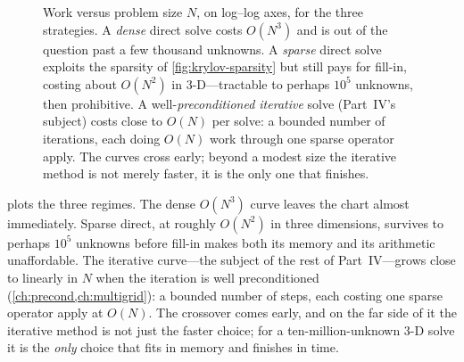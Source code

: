 \begin{figure}[t]
\centering
{}
\caption[Direct versus iterative cost]{Work versus problem size $N$, on log--log
axes, for the three strategies. A \emph{dense} direct solve costs $O(N^3)$ and is
out of the question past a few thousand unknowns. A \emph{sparse} direct solve
exploits the sparsity of \cref{fig:krylov-sparsity} but still pays for fill-in,
costing about $O(N^2)$ in 3-D---tractable to perhaps $10^5$ unknowns, then
prohibitive. A well-\emph{preconditioned iterative} solve (Part~IV's subject)
costs close to $O(N)$ per solve: a bounded number of iterations, each doing $O(N)$
work through one sparse operator apply. The curves cross early; beyond a modest
size the iterative method is not merely faster, it is the only one that finishes.}
\label{fig:krylov-cost}
\end{figure}

 plots the three regimes. The dense $O(N^3)$ curve leaves
the chart almost immediately. Sparse direct, at roughly $O(N^2)$ in three
dimensions, survives to perhaps $10^5$ unknowns before fill-in makes both its
memory and its arithmetic unaffordable. The iterative curve---the subject of the
rest of Part~IV---grows close to linearly in $N$ when the iteration is well
preconditioned (\cref{ch:precond,ch:multigrid}): a bounded number of steps, each
costing one sparse operator apply at $O(N)$. The crossover comes early, and on the
far side of it the iterative method is not just the faster choice; for a
ten-million-unknown 3-D solve it is the \emph{only} choice that fits in memory and
finishes in time.

